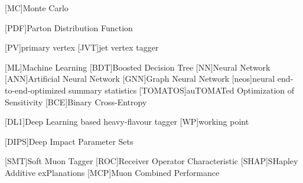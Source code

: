 \begin{acronym}[neos]
    [MC]{Monte Carlo}

    [PDF]{Parton Distribution Function}


    [PV]{primary vertex}
    [JVT]{jet vertex tagger}

    [ML]{Machine Learning}
    [BDT]{Boosted Decision Tree}
    [NN]{Neural Network}
    [ANN]{Artificial Neural Network}
    [GNN]{Graph Neural Network}
    [neos]{neural end-to-end-optimized summary statistics}
    [TOMATOS]{auTOMATed Optimization of Sensitivity}
    [BCE]{Binary Cross-Entropy}

    [DL1]{Deep Learning based heavy-flavour tagger}
    [WP]{working point}

    [DIPS]{Deep Impact Parameter Sets}

    [SMT]{Soft Muon Tagger}
    [ROC]{Receiver Operator Characteristic}
    [SHAP]{SHapley Additive exPlanations}
    [MCP]{Muon Combined Performance}


\end{acronym}

